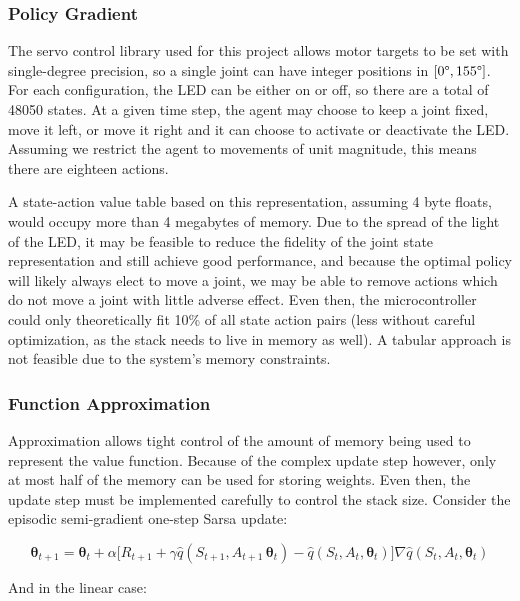 \documentclass{article}
\begin{document}
\subsubsection{Policy Gradient}



The servo control library used for this project allows motor targets to be set with single-degree precision, so a single joint can have integer positions in  $[0\degree, 155\degree]$. For each configuration, the LED can be either on or off, so there are a total of 48050 states. At a given time step, the agent may choose to keep a joint fixed, move it left, or move it right and it can choose to activate or deactivate the LED. Assuming we restrict the agent to movements of unit magnitude, this means there are eighteen actions.

A state-action value table based on this representation, assuming 4 byte floats, would occupy more than 4 megabytes of memory. Due to the spread of the light of the LED, it may be feasible to reduce the fidelity of the joint state representation and still achieve good performance, and because the optimal policy will likely always elect to move a joint, we may be able to remove actions which do not move a joint with little adverse effect. Even then, the microcontroller could only theoretically fit 10\% of all state action pairs (less without careful optimization, as the stack needs to live in memory as well). A tabular approach is not feasible due to the system's memory constraints.

\subsubsection{Function Approximation}

Approximation allows tight control of the amount of memory being used to represent the value function. Because of the complex update step however, only at most half of the memory can be used for storing weights. Even then, the update step must be implemented carefully to control the stack size. Consider the episodic semi-gradient one-step Sarsa update:

\begin{equation}\label{eqn:update}
\bm{\theta}_{t+1} = 
\bm{\theta}_t + 
\alpha \Big[
	R_{t+1} + 
	\gamma \hat{q}(S_{t+1}, A_{t+1}\, \bm{\theta}_t) 
	- \hat{q}(S_t, A_t, \bm{\theta}_t)
\Big]
\nabla\hat{q}(S_t, A_t, \bm{\theta}_t)\tag{1}
\end{equation}

And in the linear case:
\end{document}
